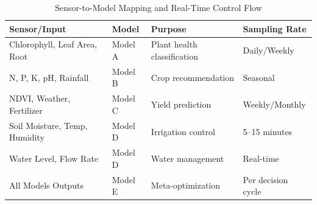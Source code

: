 \documentclass[conference]{IEEEtran}
\begin{document}
\begin{table}[htbp]
\caption{Sensor-to-Model Mapping and Real-Time Control Flow}
\begin{center}
\small
\begin{tabular}{|l|l|p{4cm}|l|}
\hline
\textbf{Sensor/Input} & \textbf{Model} & \textbf{Purpose} & \textbf{Sampling Rate} \\
\hline
Chlorophyll, Leaf Area, Root & Model A & Plant health classification & Daily/Weekly \\
N, P, K, pH, Rainfall & Model B & Crop recommendation & Seasonal \\
NDVI, Weather, Fertilizer & Model C & Yield prediction & Weekly/Monthly \\
Soil Moisture, Temp, Humidity & Model D & Irrigation control & 5--15 minutes \\
Water Level, Flow Rate & Model D & Water management & Real-time \\
All Models Outputs & Model E & Meta-optimization & Per decision cycle \\
\hline
\end{tabular}
\label{tab:sensor_mapping}
\end{center}
\end{table}
\end{document}

